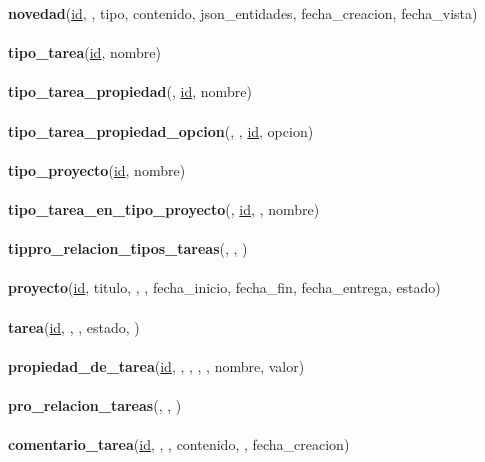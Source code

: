 \documentclass[a4paper, 12pt,twoside]{report}  %
\numberwithin{equation}{subsection} %
\begin{document}
\textbf{novedad}(\underline{id}, , tipo, contenido, json\_entidades, fecha\_creacion, fecha\_vista)
\\\\
\textbf{tipo\_tarea}(\underline{id}, nombre)
\\\\
\textbf{tipo\_tarea\_propiedad}(\underline{}, \underline{id}, nombre)
\\\\
\textbf{tipo\_tarea\_propiedad\_opcion}(\underline{}, \underline{}, \underline{id}, opcion)
\\\\
\textbf{tipo\_proyecto}(\underline{id}, nombre)
\\\\
\textbf{tipo\_tarea\_en\_tipo\_proyecto}(\underline{}, \underline{id}, , nombre)
\\\\
\textbf{tippro\_relacion\_tipos\_tareas}(\underline{}, \underline{}, \underline{})
\\\\
\textbf{proyecto}(\underline{id}, titulo, , , fecha\_inicio, fecha\_fin, fecha\_entrega, estado)
\\\\
\textbf{tarea}(\underline{id}, \underline{}, , estado, )
\\\\
\textbf{propiedad\_de\_tarea}(\underline{id}, \underline{}, \underline{}, , , nombre, valor)
\\\\
\textbf{pro\_relacion\_tareas}(\underline{}, \underline{}, \underline{})
\\\\
\textbf{comentario\_tarea}(\underline{id}, \underline{}, \underline{}, contenido, , fecha\_creacion)
\end{document}
